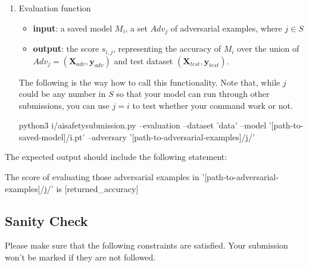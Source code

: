 \begin{enumerate}
\begin{cmds}
\end{cmds}
    \item Evaluation function
    \begin{itemize}
        \item \textbf{input}: a saved model $M_i$, a set $Adv_j$ of adversarial examples, where $j\in S$
        \item \textbf{output}: the score $s_{i,j}$, representing the accuracy of $M_i$ over the union of $Adv_j=(\textbf{X}_{adv},\textbf{y}_{adv})$ and test dataset $(\textbf{X}_{test},\textbf{y}_{test})$. 
    \end{itemize}
The following is the way how to call this functionality. Note that, while $j$ could be any number in $S$ so that your model can run through other submissions, you can use $j=i$ to test whether your command work or not.  
\begin{cmds}
python3 i/aisafetysubmission.py --evaluation --dataset 'data' --model '[path-to-saved-model]/i.pt' --adversary '[path-to-adversarial-examples]/j/'
\end{cmds}
\end{enumerate}
The expected output should include the following statement: 
\begin{cmds}
The score of evaluating those adversarial examples in '[path-to-adversarial-examples]/j/' is [returned_accuracy]
\end{cmds}

\fi

\iffalse

\section{Submission Files} 

You are expected to submit the following two files:  
\begin{itemize}
    \item \textbf{$i$.zip} 
    \item \textbf{$i$.pt}
\end{itemize}
Note that, please make sure that \textbf{$i$.pt} is the one generated by the first command.  

\fi

\subsection*{Sanity Check} 

Please make sure that the following constraints are satisfied. Your submission won't be marked if they are not followed. 

